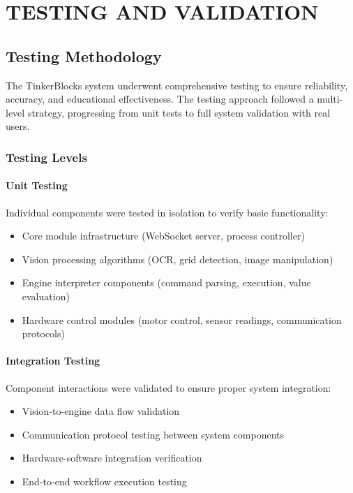 \chapter{TESTING AND VALIDATION}

\section{Testing Methodology}

The TinkerBlocks system underwent comprehensive testing to ensure reliability, accuracy, and educational effectiveness. The testing approach followed a multi-level strategy, progressing from unit tests to full system validation with real users.

\subsection{Testing Levels}

\subsubsection{Unit Testing}
Individual components were tested in isolation to verify basic functionality:
\begin{itemize}
    \item Core module infrastructure (WebSocket server, process controller)
    \item Vision processing algorithms (OCR, grid detection, image manipulation)
    \item Engine interpreter components (command parsing, execution, value evaluation)
    \item Hardware control modules (motor control, sensor readings, communication protocols)
\end{itemize}

\subsubsection{Integration Testing}
Component interactions were validated to ensure proper system integration:
\begin{itemize}
    \item Vision-to-engine data flow validation
    \item Communication protocol testing between system components
    \item Hardware-software integration verification
    \item End-to-end workflow execution testing
\end{itemize}

